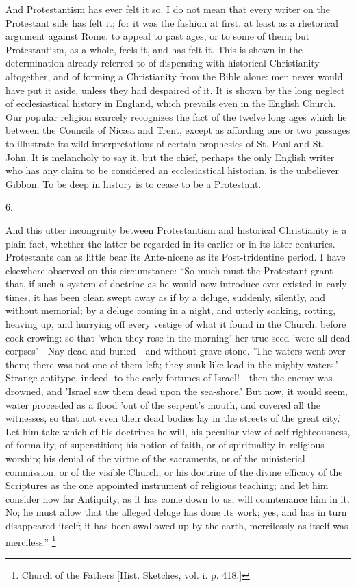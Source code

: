 And Protestantism has ever felt it so. I do not mean
that every writer on the Protestant side has felt it; for
it was the fashion at first, at least as a rhetorical
argument against Rome, to appeal to past ages, or to some
of them; but Protestantism, as a whole, feels it, and has
felt it. This is shown in the determination already
referred to of dispensing with historical Christianity
altogether, and of forming a Christianity from the Bible
alone: men never would have put it aside, unless they had
despaired of it. It is shown by the long neglect of
ecclesiastical history in England, which prevails even in
the English Church. Our popular religion scarcely
recognizes the fact of the twelve long ages which lie
between the Councils of Nicæa and Trent, except as
affording one or two passages to illustrate its wild
interpretations of certain prophesies of St. Paul and St.
John. It is melancholy to say it, but the chief, perhaps
the only English writer who has any claim to be
considered an ecclesiastical historian, is the unbeliever
Gibbon. To be deep in history is to cease to be a
Protestant.

6.

And this utter incongruity between Protestantism and
historical Christianity is a plain fact, whether the
latter be regarded in its earlier or in its later
centuries. Protestants can as little bear its Ante-nicene
as its Post-tridentine period. I have elsewhere observed
on this circumstance: ``So much must the Protestant
grant that, if such a system of doctrine as he would now
introduce ever existed in early times, it has been clean
swept away as if by a deluge, suddenly, silently, and
without memorial; by a deluge coming in a night, and
utterly soaking, rotting, heaving up, and hurrying off
every vestige of what it found in the Church, before
cock-crowing: so that 'when they rose in the morning' her
true seed 'were all dead corpses'—Nay dead and
buried—and without grave-stone. 'The waters went
over them; there was not one of them left; they sunk like
lead in the mighty waters.' Strange antitype, indeed, to
the early fortunes of Israel!—then the enemy was
drowned, and 'Israel saw them dead upon the sea-shore.'
But now, it would seem, water proceeded as a flood 'out
of the serpent's mouth, and covered all the witnesses, so
that not even their dead bodies lay in the streets of the
great city.' Let him take which of his doctrines he will,
his peculiar view of self-righteousness, of formality, of
superstition; his notion of faith, or of spirituality in
religious worship; his denial of the virtue of the
sacraments, or of the ministerial commission, or of the
visible Church; or his doctrine of the divine efficacy of
the Scriptures as the one appointed instrument of
religious teaching; and let him consider how far
Antiquity, as it has come down to us, will countenance
him in it. No; he must allow that the alleged deluge has
done its work; yes, and has in turn disappeared itself;
it has been swallowed up by the earth, mercilessly as
itself was merciless.'' \footnote{Church of the Fathers [Hist. Sketches, vol. i. p. 418.]}

